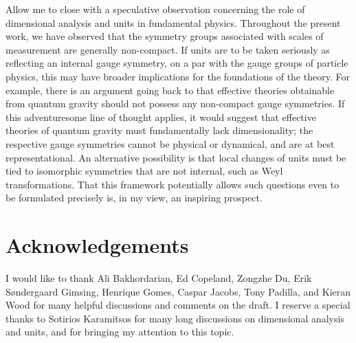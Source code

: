 \documentclass[12pt]{article}
\numberwithin{equation}{section}
\begin{document}
Allow me to close with a speculative observation concerning the role of dimensional analysis and units in fundamental physics. Throughout the present work, we have observed that the symmetry groups associated with scales of measurement are generally non-compact. If units are to be taken seriously as reflecting an internal gauge symmetry, on a par with the gauge groups of particle physics, this may have broader implications for the foundations of the theory. For example, there is an argument going back to \citet{BanksSeiberg2011} \citep[see also][]{GarglianoTudball2026} that effective theories obtainable from quantum gravity should not possess any non-compact gauge symmetries. If this adventuresome line of thought applies, it would suggest that effective theories of quantum gravity must fundamentally lack dimensionality; the respective gauge symmetries cannot be physical or dynamical, and are at best representational. An alternative possibility is that local changes of units must be tied to isomorphic symmetries that are not internal, such as Weyl transformations. That this framework potentially allows such questions even to be formulated precisely is, in my view, an inspiring prospect.

\section*{Acknowledgements}
I would like to thank Ali Bakhordarian, Ed Copeland, Zongzhe Du, Erik Søndergaard Gimsing, Henrique Gomes, Caspar Jacobs, Tony Padilla, and Kieran Wood for many helpful discussions and comments on the draft. I reserve a special thanks to Sotirios Karamitsos for many long discussions on dimensional analysis and units, and for bringing my attention to this topic. 

\end{document}
